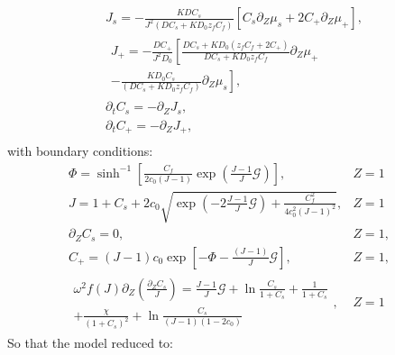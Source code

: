\documentclass[12pt]{extarticle}
\begin{document}
\begin{gather}
J_s =-\frac{KDC_s}{J^2(DC_s+KD_0z_fC_f)}\left[C_s \partial_Z \mu_s + 2C_+\partial_Z \mu_+\right],\\[2mm]
\begin{aligned}
J_+= - \frac{DC_+}{J^2D_0}\left[\frac{DC_s+KD_0(z_fC_f+2C_+)}{DC_s+KD_0z_fC_f}\partial_Z\mu_+\right.\\
\left.- \frac{KD_0C_s}{(DC_s+KD_0z_fC_f)}\partial_Z \mu_s\right],
\end{aligned}\\
\partial_t C_s =- \partial_Z J_s,\\
\partial_t C_+ = -\partial_Z J_+,\\[2mm]
\end{gather}
with boundary conditions:
\begin{eqnarray}
\Phi= \sinh^{-1}\left[\frac{C_f}{2c_0 (J-1)}\exp\left(\frac{J-1}{J}\mathcal{G}\right)\right], & Z=1&\\
J=1+C_{s}+ 2c_0\sqrt{\exp\left(-2\frac{J-1}{J}\mathcal{G}\right)+\frac{C^2_f}{4c^2_0 (J-1)^2}}, & Z=1&\\[4mm]
\partial_Z C_{s}=0,&  Z=1,&\\[5mm]
C_{+} = (J-1)c_0\exp\left[-\Phi-\frac{(J-1)}{J}\mathcal{G}\right], &Z=1,&\\
\begin{aligned}
\omega^2 f(J)\partial_{Z}\left(\frac{\partial_Z C_s}{J}\right)= \frac{J-1}{J} \mathcal{G}  + \ln \frac{C_s}{1+C_{s}} + \frac{1}{1+C_s}\\+\frac{\chi}{(1+C_{s})^2} + \ln \frac{C_s}{(J-1)(1-2c_0)}
\end{aligned}, & Z=1&
\end{eqnarray}
So that the model reduced to:
\end{document}

